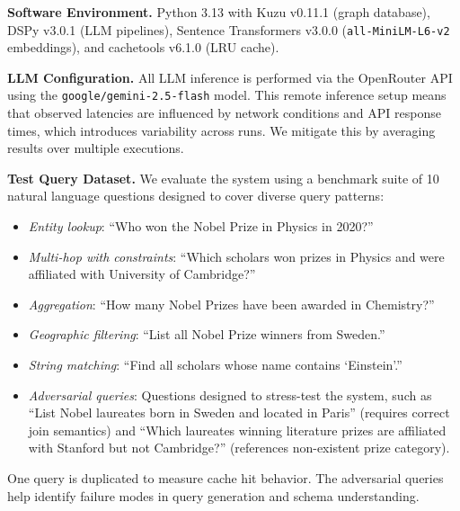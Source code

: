 \documentclass[sigconf]{acmart}
\begin{document}


\textbf{Software Environment.} Python 3.13 with Kuzu v0.11.1 (graph database), DSPy v3.0.1 (LLM pipelines), Sentence Transformers v3.0.0 (\texttt{all-MiniLM-L6-v2} embeddings), and cachetools v6.1.0 (LRU cache).

\textbf{LLM Configuration.} All LLM inference is performed via the OpenRouter API using the \texttt{google/gemini-2.5-flash} model. This remote inference setup means that observed latencies are influenced by network conditions and API response times, which introduces variability across runs. We mitigate this by averaging results over multiple executions.

\textbf{Test Query Dataset.} We evaluate the system using a benchmark suite of 10 natural language questions designed to cover diverse query patterns:
\begin{itemize}
  \item \textit{Entity lookup}: ``Who won the Nobel Prize in Physics in 2020?''
  \item \textit{Multi-hop with constraints}: ``Which scholars won prizes in Physics and were affiliated with University of Cambridge?''
  \item \textit{Aggregation}: ``How many Nobel Prizes have been awarded in Chemistry?''
  \item \textit{Geographic filtering}: ``List all Nobel Prize winners from Sweden.''
  \item \textit{String matching}: ``Find all scholars whose name contains `Einstein'.''
  \item \textit{Adversarial queries}: Questions designed to stress-test the system, such as ``List Nobel laureates born in Sweden and located in Paris'' (requires correct join semantics) and ``Which laureates winning literature prizes are affiliated with Stanford but not Cambridge?'' (references non-existent prize category).
\end{itemize}
One query is duplicated to measure cache hit behavior. The adversarial queries help identify failure modes in query generation and schema understanding.
\end{document}
